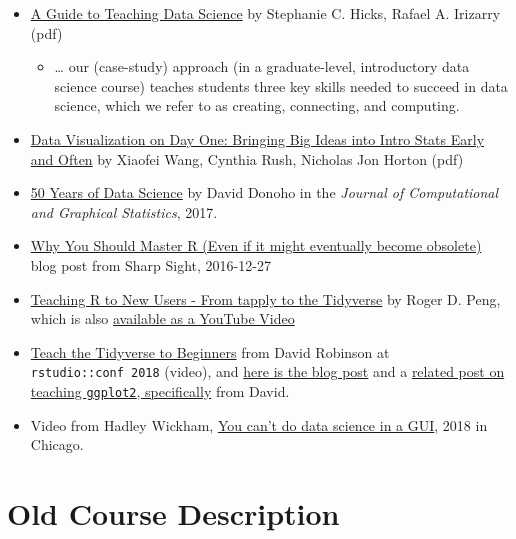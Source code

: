 \documentclass[
]{book}
\providecommand{\tightlist}{%
  \setlength{\itemsep}{0pt}\setlength{\parskip}{0pt}}
\begin{document}
\begin{itemize}
\tightlist
\item
  \href{https://arxiv.org/abs/1612.07140}{A Guide to Teaching Data Science} by Stephanie C. Hicks, Rafael A. Irizarry (pdf)

  \begin{itemize}
  \tightlist
  \item
    \ldots{} our (case-study) approach (in a graduate-level, introductory data science course) teaches students three key skills needed to succeed in data science, which we refer to as creating, connecting, and computing.
  \end{itemize}
\item
  \href{https://arxiv.org/abs/1705.08544}{Data Visualization on Day One: Bringing Big Ideas into Intro Stats Early and Often} by Xiaofei Wang, Cynthia Rush, Nicholas Jon Horton (pdf)
\item
  \href{https://www.tandfonline.com/doi/full/10.1080/10618600.2017.1384734}{50 Years of Data Science} by David Donoho in the \emph{Journal of Computational and Graphical Statistics}, 2017.
\item
  \href{https://www.sharpsightlabs.com/blog/master-r-obsolete/}{Why You Should Master R (Even if it might eventually become obsolete)} blog post from Sharp Sight, 2016-12-27
\item
  \href{https://simplystatistics.org/2018/07/12/use-r-keynote-2018/}{Teaching R to New Users - From tapply to the Tidyverse} by Roger D. Peng, which is also \href{https://www.youtube.com/watch?v=5033jBHFiHE\&feature=youtu.be}{available as a YouTube Video}
\item
  \href{https://www.rstudio.com/resources/videos/teach-the-tidyverse-to-beginners/}{Teach the Tidyverse to Beginners} from David Robinson at \texttt{rstudio::conf\ 2018} (video), and \href{http://varianceexplained.org/r/teach-tidyverse/}{here is the blog post} and a \href{http://varianceexplained.org/r/teach_ggplot2_to_beginners/}{related post on teaching \texttt{ggplot2}, specifically} from David.
\item
  Video from Hadley Wickham, \href{https://www.youtube.com/watch?v=PURtmHwk_-0}{You can't do data science in a GUI}, 2018 in Chicago.
\end{itemize}

\hypertarget{old-course-description}{%
\chapter{Old Course Description}\label{old-course-description}}
\end{document}
